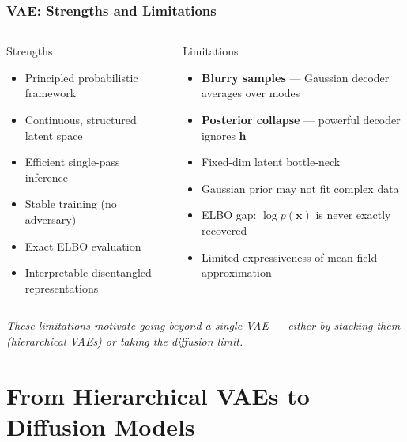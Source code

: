 \documentclass{beamer}
\begin{document}
\begin{frame}
\frametitle{VAE: Strengths and Limitations}

\begin{columns}
\begin{block}{Strengths}
\begin{itemize}
  \item Principled probabilistic framework
  \item Continuous, structured latent space
  \item Efficient single-pass inference
  \item Stable training (no adversary)
  \item Exact ELBO evaluation
  \item Interpretable disentangled representations
\end{itemize}
\end{block}
\begin{block}{Limitations}
\begin{itemize}
  \item \textbf{Blurry samples} — Gaussian decoder averages over modes
  \item \textbf{Posterior collapse} — powerful decoder ignores $\bm{h}$
  \item Fixed-dim latent bottle-neck
  \item Gaussian prior may not fit complex data
  \item ELBO gap: $\log p(\bm{x})$ is never exactly recovered
  \item Limited expressiveness of mean-field approximation
\end{itemize}
\end{block}
\end{columns}
\vspace{2mm}
\textit{These limitations motivate going beyond a single VAE —
either by stacking them (hierarchical VAEs) or taking the diffusion limit.}
\end{frame}

\section{From Hierarchical VAEs to Diffusion Models}
\end{document}
